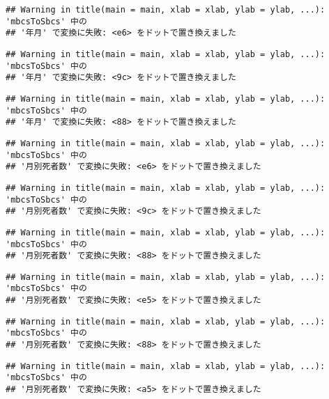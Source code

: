 \documentclass[]{article}
\begin{document}
\begin{verbatim}
## Warning in title(main = main, xlab = xlab, ylab = ylab, ...): 'mbcsToSbcs' 中の
## '年月' で変換に失敗: <e6> をドットで置き換えました
\end{verbatim}

\begin{verbatim}
## Warning in title(main = main, xlab = xlab, ylab = ylab, ...): 'mbcsToSbcs' 中の
## '年月' で変換に失敗: <9c> をドットで置き換えました
\end{verbatim}

\begin{verbatim}
## Warning in title(main = main, xlab = xlab, ylab = ylab, ...): 'mbcsToSbcs' 中の
## '年月' で変換に失敗: <88> をドットで置き換えました
\end{verbatim}

\begin{verbatim}
## Warning in title(main = main, xlab = xlab, ylab = ylab, ...): 'mbcsToSbcs' 中の
## '月別死者数' で変換に失敗: <e6> をドットで置き換えました
\end{verbatim}

\begin{verbatim}
## Warning in title(main = main, xlab = xlab, ylab = ylab, ...): 'mbcsToSbcs' 中の
## '月別死者数' で変換に失敗: <9c> をドットで置き換えました
\end{verbatim}

\begin{verbatim}
## Warning in title(main = main, xlab = xlab, ylab = ylab, ...): 'mbcsToSbcs' 中の
## '月別死者数' で変換に失敗: <88> をドットで置き換えました
\end{verbatim}

\begin{verbatim}
## Warning in title(main = main, xlab = xlab, ylab = ylab, ...): 'mbcsToSbcs' 中の
## '月別死者数' で変換に失敗: <e5> をドットで置き換えました
\end{verbatim}

\begin{verbatim}
## Warning in title(main = main, xlab = xlab, ylab = ylab, ...): 'mbcsToSbcs' 中の
## '月別死者数' で変換に失敗: <88> をドットで置き換えました
\end{verbatim}

\begin{verbatim}
## Warning in title(main = main, xlab = xlab, ylab = ylab, ...): 'mbcsToSbcs' 中の
## '月別死者数' で変換に失敗: <a5> をドットで置き換えました
\end{verbatim}
\end{document}
